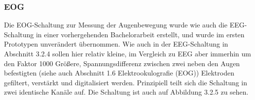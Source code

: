 \subsubsection{EOG} \label{eog-1}

Die EOG-Schaltung zur Messung der Augenbewegung wurde wie auch die EEG-Schaltung in einer vorhergehenden Bachelorarbeit erstellt, und wurde im ersten Prototypen unverändert übernommen. Wie auch in der EEG-Schaltung in Abschnitt 3.2.4 sollen hier relativ kleine, im Vergleich zu EEG aber immerhin um den Faktor 1000 Größere, Spannungsdifferenz zwischen zwei neben den Augen befestigten (siehe auch Abschnitt 1.6 Elektrookulografie (EOG)) Elektroden gefiltert, verstärkt  und digitalisiert werden. Prinzipiell teilt sich die Schaltung in zwei identische Kanäle auf. Die Schaltung ist auch auf Abbildung 3.2.5 zu sehen.




